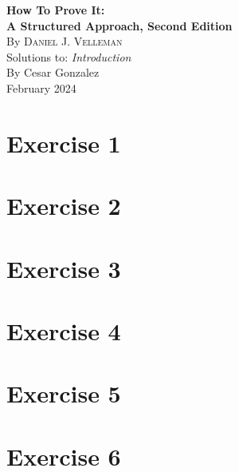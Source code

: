 \documentclass[letterpaper,12pt]{article}
\begin{document}
\pagestyle{fancy}
\setlength{\headheight}{15pt}
\begin{flushleft}

\begin{center}

    {\Large\textbf{How To Prove It:}\\[0.2em] %
    \Large\textbf{A Structured Approach, Second Edition}}\\[1.5em]

    {\normalsize By \textsc{Daniel J. Velleman}}\\[1.5em]

    Solutions to: \textit{Introduction}\\[1.5em]

    By Cesar Gonzalez\\[0.5em]
    February 2024
\end{center}

\tableofcontents
\newpage

\section*{Exercise 1}


\section*{Exercise 2}


\section*{Exercise 3}


\section*{Exercise 4}


\section*{Exercise 5}


\section*{Exercise 6}


\end{flushleft}	
\end{document}
